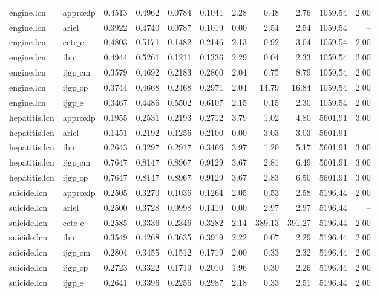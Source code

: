 \begin{table}[ht]
\begin{tabular}{llrrrrrrrrr}
engine.lcn & approxlp & 0.4513 & 0.4962 & 0.0784 & 0.1041 & 2.28 & 0.48 & 2.76 & 1059.54 & 2.00 \\
engine.lcn & ariel & 0.3922 & 0.4740 & 0.0787 & 0.1019 & 0.00 & 2.54 & 2.54 & 1059.54 & -- \\
engine.lcn & $\text{ccte\_e}$ & 0.4803 & 0.5171 & 0.1482 & 0.2146 & 2.13 & 0.92 & 3.04 & 1059.54 & 2.00 \\
engine.lcn & ibp & 0.4944 & 0.5261 & 0.1211 & 0.1336 & 2.29 & 0.04 & 2.33 & 1059.54 & 2.00 \\
engine.lcn & $\text{ijgp\_cm}$ & 0.3579 & 0.4692 & 0.2183 & 0.2860 & 2.04 & 6.75 & 8.79 & 1059.54 & 2.00 \\
engine.lcn & $\text{ijgp\_cp}$ & 0.3744 & 0.4668 & 0.2468 & 0.2971 & 2.04 & 14.79 & 16.84 & 1059.54 & 2.00 \\
engine.lcn & $\text{ijgp\_e}$ & 0.3467 & 0.4486 & 0.5502 & 0.6107 & 2.15 & 0.15 & 2.30 & 1059.54 & 2.00 \\
hepatitis.lcn & approxlp & 0.1955 & 0.2531 & 0.2193 & 0.2712 & 3.79 & 1.02 & 4.80 & 5601.91 & 3.00 \\
hepatitis.lcn & ariel & 0.1451 & 0.2192 & 0.1256 & 0.2100 & 0.00 & 3.03 & 3.03 & 5601.91 & -- \\
hepatitis.lcn & ibp & 0.2643 & 0.3297 & 0.2917 & 0.3466 & 3.97 & 1.20 & 5.17 & 5601.91 & 3.00 \\
hepatitis.lcn & $\text{ijgp\_cm}$ & 0.7647 & 0.8147 & 0.8967 & 0.9129 & 3.67 & 2.81 & 6.49 & 5601.91 & 3.00 \\
hepatitis.lcn & $\text{ijgp\_cp}$ & 0.7647 & 0.8147 & 0.8967 & 0.9129 & 3.67 & 2.83 & 6.50 & 5601.91 & 3.00 \\
suicide.lcn & approxlp & 0.2505 & 0.3270 & 0.1036 & 0.1264 & 2.05 & 0.53 & 2.58 & 5196.44 & 2.00 \\
suicide.lcn & ariel & 0.2500 & 0.3728 & 0.0998 & 0.1419 & 0.00 & 2.97 & 2.97 & 5196.44 & -- \\
suicide.lcn & $\text{ccte\_e}$ & 0.2585 & 0.3336 & 0.2346 & 0.3282 & 2.14 & 389.13 & 391.27 & 5196.44 & 2.00 \\
suicide.lcn & ibp & 0.3549 & 0.4268 & 0.3635 & 0.3919 & 2.22 & 0.07 & 2.29 & 5196.44 & 2.00 \\
suicide.lcn & $\text{ijgp\_cm}$ & 0.2804 & 0.3455 & 0.1512 & 0.1719 & 2.00 & 0.33 & 2.32 & 5196.44 & 2.00 \\
suicide.lcn & $\text{ijgp\_cp}$ & 0.2723 & 0.3322 & 0.1719 & 0.2010 & 1.96 & 0.30 & 2.26 & 5196.44 & 2.00 \\
suicide.lcn & $\text{ijgp\_e}$ & 0.2641 & 0.3396 & 0.2256 & 0.2987 & 2.18 & 0.33 & 2.51 & 5196.44 & 2.00 \\

\end{tabular}
\end{table}
